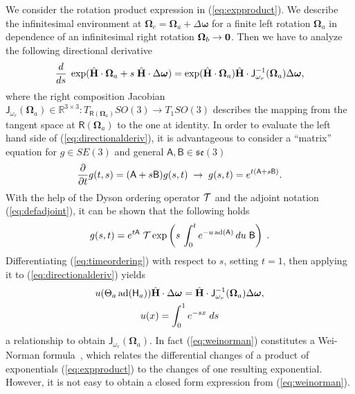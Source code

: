 \documentclass[journal]{IEEEtran}
\newcommand{\real}{\mathbb{R}}
\newcommand{\bfomega}{\boldsymbol{\omega}}
\newcommand{\bfOmega}{\boldsymbol{\Omega}}
\newcommand{\adj}[1]{\mathrm{ad}({#1})}
\newcommand{\beq}{\begin{equation}}
\newcommand{\eeq}{\end{equation}}
\begin{document}
We consider the rotation product expression in (\ref{eq:expproduct}). We
describe the infinitesimal environment at $\bfOmega_c = \bfOmega_a + \Delta\bfomega$
for a finite left rotation $\bfOmega_a$ in dependence of an infinitesimal right rotation $\bfOmega_b \rightarrow \bf 0$.
Then we have to analyze the following directional derivative
\beq
    {d\over ds}\;\exp(\hat{\bf H}\cdot\bfOmega_a + s\;\hat{\bf H}\cdot\Delta\bfomega)
    = \exp(\hat{\bf H}\cdot\bfOmega_a) \hat{\bf H}\cdot\mathsf{J}_{\omega_r}^{-1}(\bfOmega_a)
    \Delta\bfomega,
    \label{eq:directionalderiv}
\eeq
where the right composition Jacobian $\mathsf{J}_{\omega_r}(\bfOmega_a) \in \real^{3\times3}: 
T_{\mathsf{R}(\bfOmega_a)}SO(3)\rightarrow T_1SO(3)$ describes the
mapping from the tangent space at $\mathsf{R}(\bfOmega_a)$ to the one at identity.
In order to evaluate the left hand side of (\ref{eq:directionalderiv}), it is advantageous to
consider a ``matrix'' equation for $g\in SE(3)$ and general $\mathsf{A},\mathsf{B}\in \mathfrak{se}(3)$
\beq
    {\partial \over \partial t}g(t,s) = (\mathsf{A} + s\mathsf{B})g(s,t)\; \rightarrow \;
    g(s,t) = e^{t (\mathsf{A}+s\mathsf{B})}. \label{eq:SE3diff}
\eeq
With the help of the Dyson ordering operator ${\cal T}$ 
and the adjoint notation (\ref{eq:defadjoint}), it can be shown that the following holds
\beq
    g(s,t) = e^{t \mathsf{A}} \; {\cal T}\exp\left( s\,
    \int_0^t e^{-u\, \adj{\mathsf{A}}} \, du \; \mathsf{B} \right ) \; .
    \label{eq:timeordering}
\eeq
Differentiating (\ref{eq:timeordering}) with respect to $s$, setting $t=1$,
then applying it to (\ref{eq:directionalderiv}) yields
\begin{multline}
    u(\Theta_a\, \adj{\mathsf{H}_a} )
    \hat{\bf H}\cdot\Delta\bfomega = \hat{\bf H}\cdot \mathsf{J}_{\omega_r}^{-1}(\bfOmega_a)
    \Delta\bfomega,\\
    u(x)=\int_0^1 e^{-s x} \; ds
    \label{eq:weinorman}
\end{multline}
a relationship to obtain $\mathsf{J}_{\omega_r}(\bfOmega_a)$. In fact (\ref{eq:weinorman}) constitutes a
Wei-Norman formula~\cite{Wei-Norman}, which relates the differential changes of a product of
exponentials (\ref{eq:expproduct}) to the changes of one resulting exponential. However, it is not easy to obtain a closed form expression from (\ref{eq:weinorman}).
\end{document}
